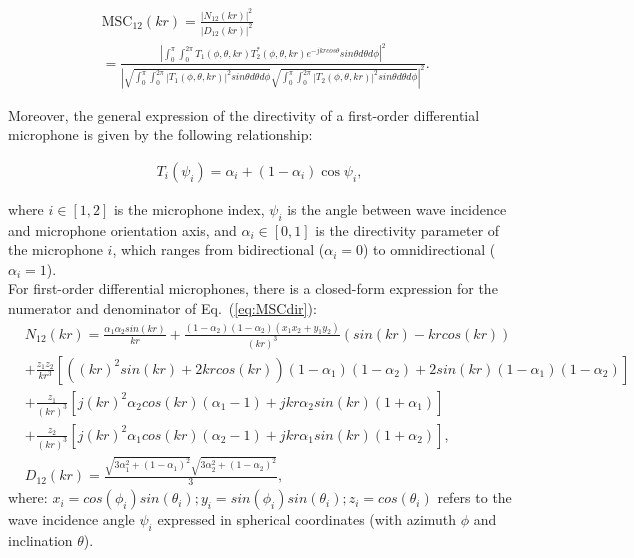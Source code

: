 \begin{equation}
	\begin{aligned}
&\text{MSC}_{12}(k r) = \frac{|N_{12}(k r)|^2}{|D_{12}(kr)|^2} \\
&= \frac{|\int_{0}^{\pi} \int_{0}^{2\pi} T_1(\phi,\theta,k r) T_2^*(\phi,\theta,k r) e^{-jk r cos\theta} sin\theta d\theta d\phi|^2}{|\sqrt{ \int_{0}^{\pi} \int_{0}^{2\pi} |T_1(\phi,\theta,k r)|^2 sin\theta d\theta d\phi } \sqrt{\int_{0}^{\pi} \int_{0}^{2\pi}|T_2(\phi,\theta,k r)|^2 sin\theta d\theta d\phi}|^2}.
\label{eq:MSCdir}
    \end{aligned}
\end{equation}


Moreover, the general expression of the directivity of a first-order differential microphone is given by the following relationship:

\begin{equation}
	\begin{aligned}
	T_i(\psi_i) = \alpha_i + (1 - \alpha_i) \cos{\psi_i},
	\end{aligned}
\end{equation}


where $i \in [1,2]$ is the microphone index, $\psi_i$ is the angle between wave incidence and microphone orientation axis, and $\alpha_i \in [0,1]$ is the directivity parameter of the microphone $i$, which ranges from bidirectional ($\alpha_i = 0$) to omnidirectional ($\alpha_i = 1$). \\


For first-order differential microphones, there is a closed-form expression for the numerator and denominator of Eq.~(\ref{eq:MSCdir}):
\begin{equation}
	\begin{aligned}
    &N_{12}(k r) =  \frac{\alpha_1 \alpha_2 sin(kr)}{kr} 
    + \frac{(1-\alpha_2)(1-\alpha_2)(x_1x_2+y_1y_2)}{(kr)^3}(sin(kr)-kr cos(kr)) \\
    &+ \frac{z_1 z_2}{kr^3}[ ( (kr)^2 sin(kr) + 2kr cos(kr) )(1-\alpha_1)(1-\alpha_2) 
    + 2 sin(kr)(1-\alpha_1)(1-\alpha_2) ] \\
    &+ \frac{z_1}{(kr)^3}[ j(kr)^2 \alpha_2 cos(kr)(\alpha_1-1) + jkr \alpha_2 sin(kr)(1+\alpha_1) ] \\
    &+ \frac{z_2}{(kr)^3}[ j(kr)^2 \alpha_1 cos(kr)(\alpha_2-1) + jkr \alpha_1 sin(kr)(1+\alpha_2) ],\\
    &D_{12}(kr) =  \frac{\sqrt{3 \alpha_1^2+(1-\alpha_1)^2}\sqrt{3 \alpha_2^2+(1-\alpha_2)^2}}{3},
    \label{eq:closedform_msc}
    \end{aligned}
\end{equation}
where: $ x_i = cos(\phi_i) sin(\theta_i); y_i = sin(\phi_i) sin(\theta_i); z_i = cos(\theta_i)$
refers to the wave incidence angle $\psi_i$ expressed in spherical coordinates (with azimuth $\phi$ and inclination $\theta$).



